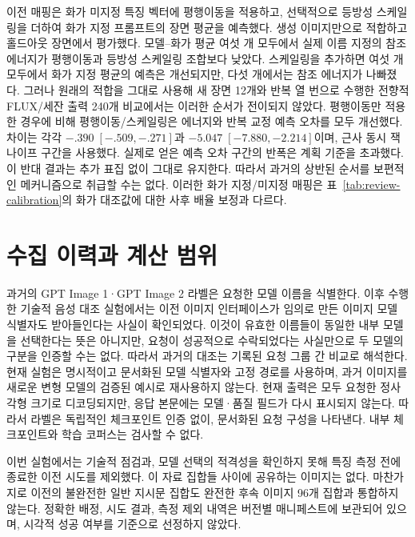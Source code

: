\documentclass[11pt,a4paper]{article}
\begin{document}
이전 매핑은 화가 미지정 특징 벡터에 평행이동을 적용하고, 선택적으로 등방성 스케일링을 더하여 화가 지정 프롬프트의 장면 평균을 예측했다. 생성 이미지만으로 적합하고 홀드아웃 장면에서 평가했다. 모델--화가 평균 여섯 개 모두에서 실제 이름 지정의 참조 에너지가 평행이동과 등방성 스케일링 조합보다 낮았다. 스케일링을 추가하면 여섯 개 모두에서 화가 지정 평균의 예측은 개선되지만, 다섯 개에서는 참조 에너지가 나빠졌다. 그러나 원래의 적합을 그대로 사용해 새 장면 12개와 반복 열 번으로 수행한 전향적 FLUX/세잔 출력 240개 비교에서는 이러한 순서가 전이되지 않았다. 평행이동만 적용한 경우에 비해 평행이동/스케일링은 에너지와 반복 교정 예측 오차를 모두 개선했다. 차이는 각각 $-.390\;[-.509,-.271]$과 $-5.047\;[-7.880,-2.214]$이며, 근사 동시 잭나이프 구간을 사용했다. 실제로 얻은 예측 오차 구간의 반폭은 계획 기준을 초과했다. 이 반대 결과는 추가 표집 없이 그대로 유지한다. 따라서 과거의 상반된 순서를 보편적인 메커니즘으로 취급할 수는 없다. 이러한 화가 지정/미지정 매핑은 표~\ref{tab:review-calibration}의 화가 대조값에 대한 사후 배율 보정과 다르다.

\clearpage
\section{수집 이력과 계산 범위}\label{app:provenance}
과거의 GPT Image 1·GPT Image 2 라벨은 요청한 모델 이름을 식별한다. 이후 수행한 기술적 음성 대조 실험에서는 이전 이미지 인터페이스가 임의로 만든 이미지 모델 식별자도 받아들인다는 사실이 확인되었다. 이것이 유효한 이름들이 동일한 내부 모델을 선택한다는 뜻은 아니지만, 요청이 성공적으로 수락되었다는 사실만으로 두 모델의 구분을 인증할 수는 없다. 따라서 과거의 대조는 기록된 요청 그룹 간 비교로 해석한다. 현재 실험은 명시적이고 문서화된 모델 식별자와 고정 경로를 사용하며, 과거 이미지를 새로운 변형 모델의 검증된 예시로 재사용하지 않는다. 현재 출력은 모두 요청한 정사각형 크기로 디코딩되지만, 응답 본문에는 모델·품질 필드가 다시 표시되지 않는다. 따라서 라벨은 독립적인 체크포인트 인증 없이, 문서화된 요청 구성을 나타낸다. 내부 체크포인트와 학습 코퍼스는 검사할 수 없다.

이번 실험에서는 기술적 점검과, 모델 선택의 적격성을 확인하지 못해 특징 측정 전에 종료한 이전 시도를 제외했다. 이 자료 집합들 사이에 공유하는 이미지는 없다. 마찬가지로 이전의 불완전한 일반 지시문 집합도 완전한 후속 이미지 96개 집합과 통합하지 않는다. 정확한 배정, 시도 결과, 측정 제외 내역은 버전별 매니페스트에 보관되어 있으며, 시각적 성공 여부를 기준으로 선정하지 않았다.
\end{document}
